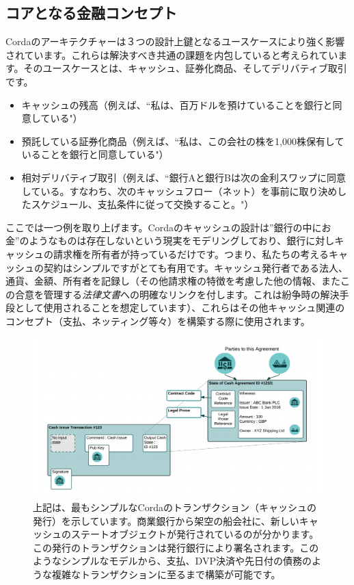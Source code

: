 \documentclass{article}
\begin{document}
\subsection{コアとなる金融コンセプト}
Cordaのアーキテクチャーは３つの設計上鍵となるユースケースにより強く影響されています。これらは解決すべき共通の課題を内包していると考えられています。そのユースケースとは、キャッシュ、証券化商品、そしてデリバティブ取引です。
\begin{itemize}
\item キャッシュの残高（例えば、``私は、百万ドルを預けていることを銀行と同意している"）
\item 預託している証券化商品（例えば、``私は、この会社の株を1,000株保有していることを銀行と同意している"）
\item 相対デリバティブ取引（例えば、``銀行Aと銀行Bは次の金利スワップに同意している。すなわち、次のキャッシュフロー（ネット）を事前に取り決めしたスケジュール、支払条件に従って交換すること。"）
\end{itemize}
ここでは一つ例を取り上げます。Cordaのキャッシュの設計は”銀行の中にお金”のようなものは存在しないという現実をモデリングしており、銀行に対しキャッシュの請求権を所有者が持っているだけです。\cite{BOE}つまり、私たちの考えるキャッシュの契約はシンプルですがとても有用です。キャッシュ発行者である法人、通貨、金額、所有者を記録し（その他請求権の特徴を考慮した他の情報、またこの合意を管理する\textit{法律文書}への明確なリンクを付します。これは紛争時の解決手段として使用されることを想定しています）、これらはその他キャッシュ関連のコンセプト（支払、ネッティング等々）を構築する際に使用されます。
\begin{figure}[H]
\includegraphics[scale = .4, center]{cash}
\caption{上記は、最もシンプルなCordaのトランザクション（キャッシュの発行）を示しています。商業銀行から架空の船会社に、新しいキャッシュのステートオブジェクトが発行されているのが分かります。この発行のトランザクションは発行銀行により署名されます。このようなシンプルなモデルから、支払、DVP決済や先日付の債務のような複雑なトランザクションに至るまで構築が可能です。}
\end{figure}
\end{document}
